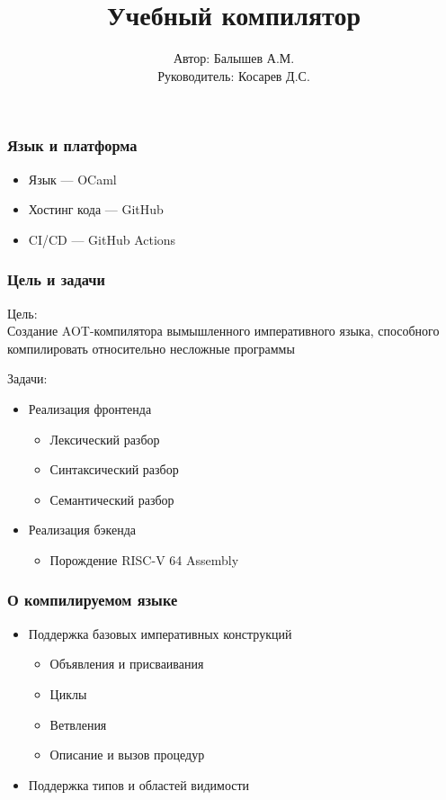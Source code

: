 \documentclass{beamer}
\title{Учебный компилятор}
\author[Балышев А.М.]{Автор: Балышев А.М. \\ Руководитель: Косарев Д.С.}
\begin{document}
	\begin{frame}[plain]
		\maketitle
	\end{frame}
	
	\begin{frame}
	\frametitle{Язык и платформа}
	\begin{itemize}
			\item Язык — OCaml
			\item Хостинг кода — GitHub
			\item CI/CD — GitHub Actions
		\end{itemize}
	\end{frame}
	
	\begin{frame}
		\frametitle{Цель и задачи}
		Цель:
		\\
		Создание AOT-компилятора вымышленного императивного языка, способного компилировать относительно несложные программы 
		
		Задачи:\\
		\begin{itemize}
			\item Реализация фронтенда
			\begin{itemize}
				\item Лексический разбор
				\item Синтаксический разбор
				\item Семантический разбор
			\end{itemize}
			\item Реализация бэкенда
			\begin{itemize}
				\item Порождение RISC-V 64 Assembly
			\end{itemize}
		\end{itemize}
	\end{frame}
	
	\begin{frame}
		\frametitle{О компилируемом языке}
		\begin{itemize}
			\item Поддержка базовых императивных конструкций
			\begin{itemize}
				\item Объявления и присваивания
				\item Циклы
				\item Ветвления
				\item Описание и вызов процедур
			\end{itemize}
			\item Поддержка типов и областей видимости
		\end{itemize}
	\end{frame}
	
\end{document}
